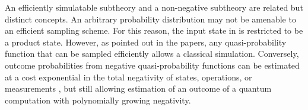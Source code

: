 An efficiently simulatable subtheory and a non-negative subtheory are related but distinct concepts. An arbitrary probability distribution may not be amenable to an efficient sampling scheme. For this reason, the input state in \cite{mari_positive_2012,veitch_negative_2012} is restricted to be a product state. However, as pointed out in the papers, any quasi-probability function that can be sampled efficiently allows a classical simulation. Conversely, outcome probabilities from negative quasi-probability functions can be estimated at a cost exponential in the total negativity of states, operations, or measurements \cite{pashayan_estimating_2015}, but still allowing estimation of an outcome of a quantum computation with polynomially growing negativity.

%	
%	
%	
%	
%
